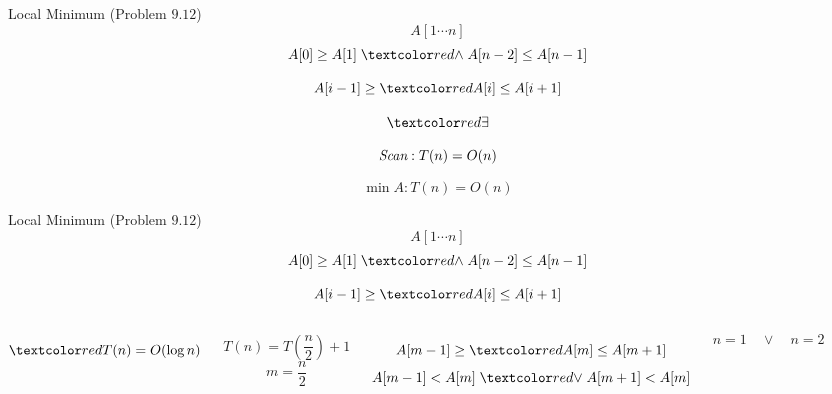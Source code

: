 \begin{frame}{}
  \begin{exampleblock}{Local Minimum (Problem $9.12$)}
    \[
      A[1 \cdots n]
    \]
    \[
      A[0] \ge A[1] \;\red{\land}\; A[n-2] \le A[n-1]
    \]

    \[
      A[i-1] \ge \red{A[i]} \le A[i+1]
    \]
  \end{exampleblock}

  \pause
  \[
    \red{\exists}
  \]

  \pause
  \[
    \text{\it Scan}: T(n) = O(n)
  \]

  \pause
  \[
    \min A: T(n) = O(n)
  \]
\end{frame}

\begin{frame}{}
  \begin{exampleblock}{Local Minimum (Problem $9.12$)}
    \[
      A[1 \cdots n]
    \]
    \[
      A[0] \ge A[1] \;\red{\land}\; A[n-2] \le A[n-1]
    \]

    \[
      A[i-1] \ge \red{A[i]} \le A[i+1]
    \]
  \end{exampleblock}

  \vspace{0.60cm}
  \begin{columns}
      \pause
      \[
	\red{T(n) = O(\log n)}
      \]

      \pause
      \[
	T(n) = T(\frac{n}{2}) + 1
      \]
      \pause
      \[
	m = \frac{n}{2}
      \]

      \pause
      \[
	A[m-1] \ge \red{A[m]} \le A[m+1]
      \]
      \[
	A[m-1] < A[m] \;\red{\lor}\; A[m+1] < A[m]
      \]

      \pause
      \[
	n = 1 \quad \lor \quad n = 2
      \]
  \end{columns}
\end{frame}

